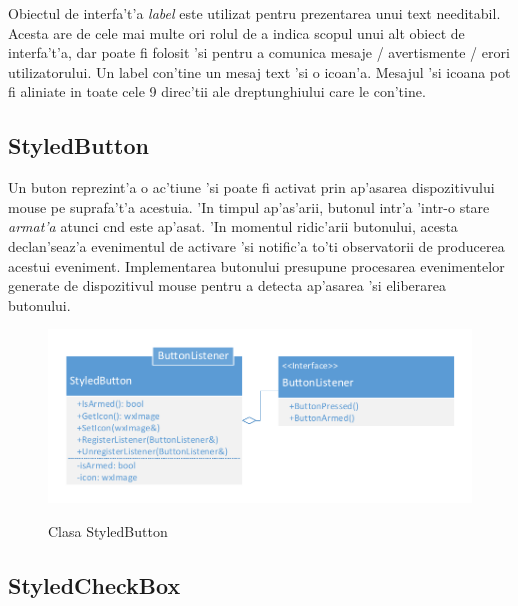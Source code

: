 Obiectul de interfa't'a \emph{label} este utilizat pentru prezentarea unui text needitabil. Acesta are de cele mai multe ori rolul de a indica scopul unui alt obiect de interfa't'a, dar poate fi folosit 'si pentru a comunica mesaje / avertismente / erori utilizatorului. Un label con'tine un mesaj text 'si o icoan'a. Mesajul 'si icoana pot fi aliniate in toate cele 9 direc'tii ale dreptunghiului care le con'tine.


\subsection{StyledButton}

Un buton reprezint'a o ac'tiune 'si poate fi activat prin ap'asarea dispozitivului mouse pe suprafa't'a acestuia. 'In timpul ap'as'arii, butonul intr'a 'intr-o stare \emph{armat'a} atunci c{\ia}nd este ap'asat. 'In momentul ridic'arii butonului, acesta declan'seaz'a evenimentul de activare 'si notific'a to'ti observatorii de producerea acestui eveniment. Implementarea butonului presupune procesarea evenimentelor generate de dispozitivul mouse pentru a detecta ap'asarea 'si eliberarea butonului. 

\begin{center}
\begin{figure}[h]
    \centering
    \includegraphics{img/uml_class_button.pdf}
    \label{fig0510}
    \caption{Clasa StyledButton}
\end{figure}
\end{center}


\subsection{StyledCheckBox}

